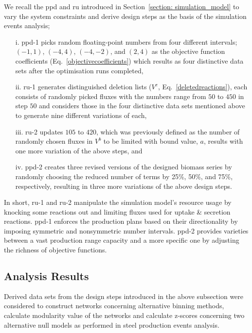 We recall the \acf{ppd} and \acf{ru} introduced in Section~\ref{section: simulation_model} to vary the system constraints and derive design steps as the basis of the simulation events analysis;
\begin{itemize}
	\item[i.] \acs{ppd}-1 picks random floating-point numbers from four different intervals; $(-1, 1)$, $(-4, 4)$, $(-4, -2)$, and $(2, 4)$ as the objective function coefficients (Eq.~\ref{objectivecoefficients}) which results as four distinctive data sets after the optimisation runs completed,
	\item[ii.] \acs{ru}-1 generates distinguished deletion lists ($V^{e}$, Eq.~\ref{deletedreactions}), each consists of randomly picked fluxes with the numbers range from $50$ to $450$ in step $50$ and considers those in the four distinctive data sets mentioned above to generate nine different variations of each,
	\item[iii.] \acs{ru}-2 updates $105$ to $420$, which was previously defined as the number of randomly chosen fluxes in $V^{b}$ to be limited with bound value, $a$, results with one more variation of the above steps, and
	\item[iv.] \acs{ppd}-2 creates three revised versions of the designed biomass series by randomly choosing the reduced number of terms by 25\%, 50\%, and 75\%, respectively, resulting in three more variations of the above design steps.
\end{itemize}

In short, \acs{ru}-1 and \acs{ru}-2 manipulate the simulation model's resource usage by knocking some reactions out and limiting fluxes used for uptake \& secretion reactions. \acs{ppd}-1 enforces the production plans based on their directionality by imposing symmetric and nonsymmetric number intervals. \acs{ppd}-2 provides varieties between a vast production range capacity and a more specific one by adjusting the richness of objective functions. %

\subsection{Analysis Results}
Derived data sets from the design steps introduced in the above subsection were considered to construct networks concerning alternative binning methods, calculate modularity value of the networks and calculate z-scores concerning two alternative null models as performed in steel production events analysis.

